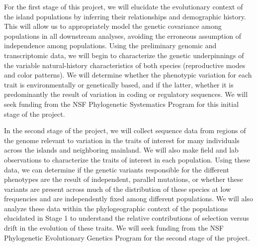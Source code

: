 For the first stage of this projcet, we will elucidate the evolutionary context
of the island populations by inferring their relationships and demographic
history.
This will allow us to appropriately model the genetic covariance among
populations in all downstream analyses, avoiding the erroneous assumption of
independence among populations.
Using the preliminary genomic and transcriptomic data, we will begin to
characterize the genetic underpinnings of the variable natural-history
characteristics of both species (reproductive modes and color patterns).
We will determine whether the phenotypic variation for each trait is
environmentally or genetically based, and if the latter, whether it is
predominantly the result of variation in coding or regulatory sequences.
We will seek funding from the NSF Phylogenetic Systematics Program for this
initial stage of the project.


In the second stage of the project, we will collect sequence data from regions
of the genome relevant to variation in the traits of interest for many
individuals across the islands and neighboring mainland.
We will also make field and lab observations to characterize the traits of
interest in each population.
Using these data, we can determine if the genetic variants responsible for the
different phenotypes are the result of independent, parallel mutations, or
whether these variants are present across much of the distribution of these
species at low frequencies and are independently fixed among different
populations.
We will also analyze these data within the phylogeographic context of the
populations elucidated in Stage 1 to understand the relative contributions of
selection versus drift in the evolution of these traits.
We will seek funding from the NSF Phylogenetic Evolutionary Genetics Program
for the second stage of the project.


